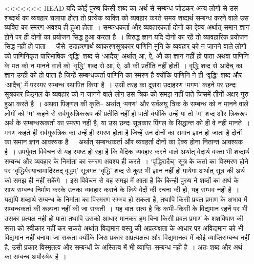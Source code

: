 <<<<<<< HEAD
यदि कोईं पुरुष किसी शब्द का अर्थ से सम्बन्ध जोड़कर अन्य लोगों से उस शब्दार्थ का व्यवहार चलाया होता तो प्रत्येक व्यक्ति को व्यवहार करते समय शब्दार्थ सम्बन्ध करने वाले उस व्यक्ति का स्मरण अवश्य ही हुआ होता~। सम्बन्धकर्ता और व्यवहारकर्ता दोनों का ऐक्य अर्थात् समान ज्ञान होने पर ही दोनों का प्रयोजन सिद्ध हुआ करता है~। विरुद्ध ज्ञान यदि दोनों का रहें तो व्यावहारिक प्रयोजन सिद्ध नहीं हो पाता~। जैसे–उदाहरणार्थ व्याकरणसूत्रकार पाणिनि मुनि के व्यवहार को न जानने वाले लोगों को पाणिनिकृत पारिभाषिक ‘वृद्धि' शब्द से ‘आदैच्' अर्थात् आ, ऐ, औ का ज्ञान नहीं हो पाता अथवा पाणिनि के मत को न मानने वालें को ‘वृद्धि' शब्द से आ, ऐ, औ की प्रतीति नहीं होती~। वृद्धि शब्द से आदैच् का ज्ञान उन्हीं को हो पाता है जिन्हें सम्बन्धकर्ता पाणिनि का स्मरण है क्योंकि पाणिनि ने ही ‘वृद्धि' शब्द और ‘आदैच्' में परस्पर सम्बन्ध स्थापित किया है~। उसी तरह का दूसरा उदाहरण ‘मगण' कहने पर छन्दः सूत्रकार पिङ्गल के व्यवहार को न जानने वाले लोग उस त्रिक को समझ नहीं पाते जिसमें तीनों अक्षर गुरु हुआ करते है~। अथवा पिङ्गल की कृति– अर्थात् ‘मगण' और सर्वलघु त्रिक के सम्बन्ध को न मानने वाले लोगों को ‘म' कहने से सर्वगुरुत्रिकरूप की प्रतीति नहीं हो पाती क्योंकि उन्हें या तो ‘म' शब्द और त्रिकरूप अर्थ के सम्बन्धरूकर्ता का स्मरण नही है, या उस छन्दः सूत्रकार पिंगल के सिद्धान्त को ही वे नही मानते~। मगण कहते ही सर्वगुरुत्रिक का उन्हें ही स्मरण होता है जिन्हें उन दोनों का समान ज्ञान हो जाता है दोनों का समान ज्ञान आवश्यक है~। अर्थात् सम्बन्धकर्ता और व्यवहर्ता दोनों का ऐक्य होना नितान्त आवश्यक है~। उपर्युक्त विवेचन से यह स्पष्ट हो रहा है कि वैदिक व्यवहार करने वाले अर्थात् वेदार्थ वक्ता भी शब्दार्थ सम्बन्ध और व्यवहार के निर्माता का स्मरण अवश्य ही करते~। ‘वृद्धिरादैच्' सूत्र के कर्ता का विस्मरण होने पर ‘वृद्धिर्यस्याचामादिस्तद् वृद्धम्' सूत्रगत ‘वृद्धि' शब्द से कुछ भी ज्ञान नहीं हो पायेगा अर्थात् सूत्र की अर्थ को समझ ही नहीं सकेंगे~। इस विवेचन से यह समझ में आता है कि किन्ही पुरुष ने शब्दों का अर्थ के साथ सम्बन्ध निर्माण करके उनका व्यवहार कराने के लिये वेदों की रचना की हो, यह सम्भव नही है~। यद्यपि शब्दार्थ सम्बन्ध के निर्माता का विस्मरण सम्भव हो सकता है, तथापि किसी प्रबल प्रमाण के अभाव में सम्बन्धकर्ता की कल्पना नहीं की जा सकती~। यह बात सत्य है कि कभी–किसी के विद्यमान रहनें पर भी उसका प्रत्यक्ष नही हो पाता तथापि उसको आधार मानकर हम बिना किसी प्रबल प्रमाण के शशविषाण की सत्ता को स्वीकार नहीं कर सकते अर्थात विद्यमान वस्तु की अप्रत्यक्षता के आधार पर अविद्यमान को भी विद्यमान नहीं बनाया जा सकता क्योंकि जिस प्रकार अप्रत्यक्षत्व और विद्यमानत्व में कोई व्याप्तिसम्बन्ध नहीं है, उसी प्रकार विस्मृतत्व और सम्बन्धों के अस्तित्व में भी व्याप्ति–सम्बन्ध नहीं है~। अतः शब्द और अर्थ का सम्बन्ध अपौरुषेय है~।

